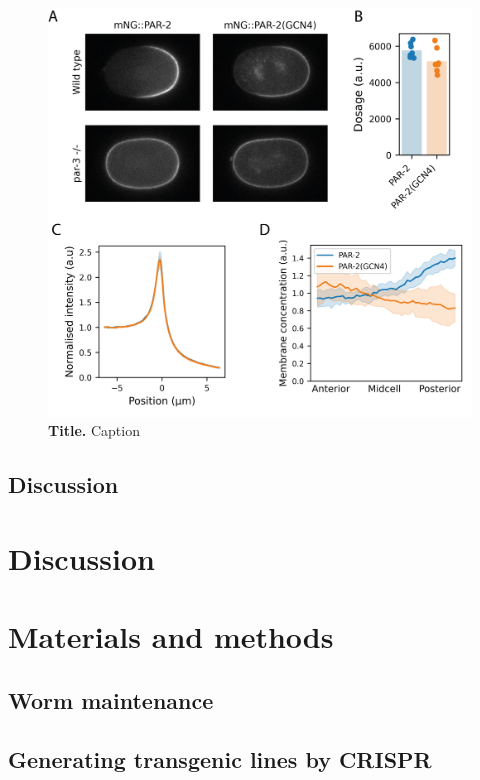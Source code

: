 \documentclass[12pt]{"report"}
\newcommand{\mycaption}[2]{\caption[#1]{\textbf{#1.} #2}}
\begin{document}
\begin{figure}[!h]
\includegraphics[scale=0.95]{gcn4_par3mut}
\setlength{\abovecaptionskip}{20pt}
\centering
\mycaption{Title}{Caption}
\label{fig:gcn4_par3mut}
\end{figure}

\section{Discussion}



\clearpage
\chapter{Discussion}


\clearpage
\chapter{Materials and methods}

\clearpage
\section{Worm maintenance}
\section{Generating transgenic lines by CRISPR}
\end{document}

